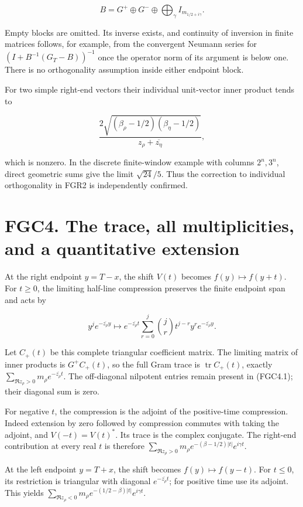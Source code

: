 \[
 B=G^+\oplus G^-\oplus\bigoplus_{\gamma}I_{m_{1/2+i\gamma}}.
\tag{FGC3.3}
\]

Empty blocks are omitted. Its inverse exists, and continuity of
inversion in finite matrices follows, for example, from the convergent
Neumann series for \((I+B^{-1}(G_T-B))^{-1}\) once the operator norm of
its argument is below one. There is no orthogonality assumption inside
either endpoint block.

For two simple right-end vectors their individual unit-vector inner
product tends to

\[
 \frac{2\sqrt{(\beta_\rho-1/2)(\beta_\eta-1/2)}}
 {z_\rho+\overline{z_\eta}},
\tag{FGC3.4}
\]

which is nonzero. In the discrete finite-window example with columns
\(2^n,3^n\), direct geometric sums give the limit \(\sqrt{24}/5\). Thus
the correction to individual orthogonality in FGR2 is independently
confirmed.

\section{FGC4. The trace, all multiplicities, and a quantitative
extension}\label{fgc4.-the-trace-all-multiplicities-and-a-quantitative-extension}

At the right endpoint \(y=T-x\), the shift \(V(t)\) becomes
\(f(y)\mapsto f(y+t)\). For \(t\geq0\), the limiting half-line
compression preserves the finite endpoint span and acts by

\[
 y^j e^{-\overline{z_\rho}y}
 \longmapsto e^{-\overline{z_\rho}t}
 \sum_{r=0}^j\binom jr t^{j-r}y^r e^{-\overline{z_\rho}y}.
\tag{FGC4.1}
\]

Let \(C_+(t)\) be this complete triangular coefficient matrix. The
limiting matrix of inner products is \(G^+C_+(t)\), so the full Gram
trace is \(\operatorname{tr}C_+(t)\), exactly
\(\sum_{\Re z_\rho>0}m_\rho e^{-\overline{z_\rho}t}\). The off-diagonal
nilpotent entries remain present in (FGC4.1); their diagonal sum is
zero.

For negative \(t\), the compression is the adjoint of the positive-time
compression. Indeed extension by zero followed by compression commutes
with taking the adjoint, and \(V(-t)=V(t)^*\). Its trace is the complex
conjugate. The right-end contribution at every real \(t\) is therefore
\(\sum_{\Re z_\rho>0}m_\rho e^{-(\beta-1/2)|t|}e^{i\gamma t}\).

At the left endpoint \(y=T+x\), the shift becomes
\(f(y)\mapsto f(y-t)\). For \(t\leq0\), its restriction is triangular
with diagonal \(e^{-\overline{z_\rho}t}\); for positive time use its
adjoint. This yields
\(\sum_{\Re z_\rho<0}m_\rho e^{-(1/2-\beta)|t|}e^{i\gamma t}\).

